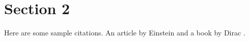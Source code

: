 \graphicspath{{Images/}}

\section{Section 2}
Here are some sample citations. An article by Einstein \cite{einstein} and a book by Dirac \cite{dirac}.
